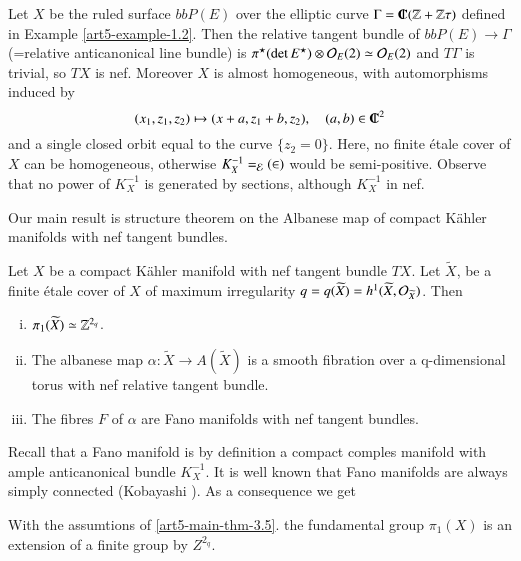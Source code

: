 \begin{example}\label{art5-example-3.4}
Let $X$ be the ruled surface $bbP(E)$ over the elliptic curve $\Gamma = \IC(\bbZ + \bbZ\tau)$ defined in Example
\ref{art5-example-1.2}. Then the relative tangent bundle of $bbP(E)\rightarrow \Gamma$(=relative anticanonical line bundle) is $\pi^{\star}(\det E^{\star})\otimes \mathcal{O}_{E}(2) \simeq \mathcal{O}_{E}(2)$ and $T\Gamma$ is trivial, so $TX$ is nef. Moreover $X$ is almost homogeneous, with automorphisms induced by
$$
(x_{1}, z_{1}, z_{2}) \mapsto (x+a, z_{1}+b, z_{2}),\quad (a,b) \in \IC^{2}
$$ 
and a single closed orbit equal to the curve $\{z_{2}=0\}$. Here, no finite \'etale cover of $X$ can be homogeneous, otherwise $K_{X}^{-1} = \cal_{E}(2)$ would be semi-positive. Observe that no power of $K_{X}^{-1}$ is generated by sections, although $K_{X}^{-1}$ in nef.
\end{example}

Our main result is structure theorem on the Albanese map of compact K\"ahler manifolds with nef tangent bundles.

\begin{main theorem}\label{art5-main-thm-3.5}
Let $X$ be a compact K\"ahler manifold with nef tangent bundle $TX$. Let $\widetilde{X}$, be a finite \'etale cover of $X$ of maximum irregularity $q=q(\widetilde{X}) = h^{1}(\widetilde{X}, \mathcal{O}_{\widetilde{X}})$. Then
    \begin{enumerate}[(i)]
        \item $\pi_{1}(\widetilde{X}) \simeq \mathbb{Z}^{2_{q}}$.\label{art5-enum_(i)}
        \item The albanese map $\alpha : \widetilde{X} \rightarrow A(\widetilde{X})$ is a smooth fibration over a q-dimensional torus with nef relative tangent bundle. \label{art5-enum_(ii)}
        \item The fibres $F$ of $\alpha$ are Fano manifolds with nef tangent bundles.\label{art5-enum_(iii)}
    \end{enumerate}
\end{main theorem}

Recall that  a Fano manifold is by definition a compact comples manifold with ample anticanonical bundle $K_{X}^{-1}$. It is well known that Fano manifolds are always simply connected (Kobayashi \cite{Ko61}). As a consequence we get 

\begin{coro}\label{art5-coro-3.6}
With the assumtions of \ref{art5-main-thm-3.5}. the fundamental group $\pi_{1}(X)$ is an extension of a finite group by $Z^{2_{q}}$.
\end{coro}

